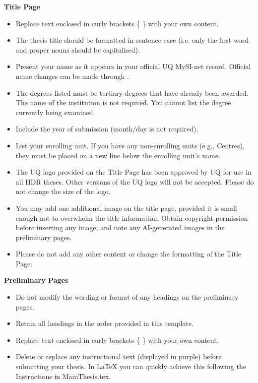 
\noindent
\textbf{\large Title Page}
\begin{itemize}
    \item Replace text enclosed in curly brackets \{ \} with your own content.
    \item The thesis title should be formatted in sentence case (i.e. only the first word and proper nouns should be capitalised).
    \item Present your name as it appears in your official UQ MySI-net record. Official name changes can be made through \href{https://my.uq.edu.au/contact/student-central}{\color{blue}{UQ Student Central}}.
    \item The degrees listed must be tertiary degrees that have already been awarded. The name of the institution is not required. You cannot list the degree currently being examined.
    \item Include the year of submission (month/day is not required).
    \item List your enrolling unit. If you have any non-enrolling units (e.g., Centres), they must be placed on a new line below the enrolling unit’s name.
    \item The UQ logo provided on the Title Page has been approved by UQ for use in all HDR theses. Other versions of the UQ logo will not be accepted. Please do not change the size of the logo.
    \item You may add one additional image on the title page, provided it is small enough not to overwhelm the title information. Obtain copyright permission before inserting any image, and note any AI-generated images in the preliminary pages.
    \item Please do not add any other content or change the formatting of the Title Page.
\end{itemize}

\vspace{0.3em}

\noindent
\textbf{\large Preliminary Pages}   
\begin{itemize}
\itemsep0em 
    \item Do not modify the wording or format of any headings on the preliminary pages.
    \item Retain all headings in the order provided in this template.
    \item Replace text enclosed in curly brackets \{ \} with your own content.
    \item Delete or replace any instructional text (displayed in purple) before submitting your thesis. In LaTeX you can quickly achieve this following the Instructions in MainThesis.tex.
\end{itemize}

